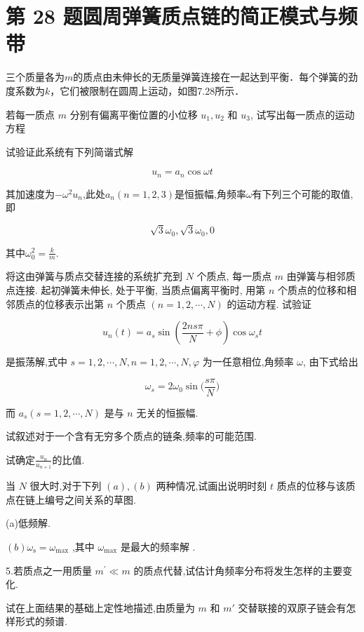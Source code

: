 \documentclass[UTF8,fontset=fandol,a4paper,11pt]{ctexart}
\newcommand{\tagline}[1]{\noindent{\small\color{muted}#1}\par}
\begin{document}
\section*{第 28 题\quad 圆周弹簧质点链的简正模式与频带}

\tagline{M-07-28}

三个质量各为\(m\)的质点由未伸长的无质量弹簧连接在一起达到平衡．每个弹簧的劲度系数为\(k\)，它们被限制在圆周上运动，如图7.28所示．

若每一质点 \(m\) 分别有偏离平衡位置的小位移 \(u_{1}, u_{2}\) 和
\(u_{3}\), 试写出每一质点的运动方程

试验证此系统有下列简谐式解

\[
u_{ n } = a_{ n } \cos \omega t
\]

其加速度为\(-\omega^{2}u_{n}\),此处\(a_{n}(n=1,2,3)\)是恒振幅,角频率\(\omega\)有下列三个可能的取值,即

\[
\sqrt{ 3 } \omega_{ 0 } , \sqrt{ 3 } \omega_{ 0 } , 0
\]

其中\(\omega_{0}^{2}=\frac{k}{m}\).

将这由弹簧与质点交替连接的系统扩充到 \(N\) 个质点, 每一质点 \(m\)
由弹簧与相邻质点连接. 起初弹簧未伸长, 处于平衡, 当质点偏离平衡时, 用第
\(n\) 个质点的位移和相邻质点的位移表示出第 \(n\) 个质点
\((n=1,2, \cdots, N)\) 的运动方程. 试验证

\[
u_{ n } ( t ) = a_{ s } \sin \left( \frac{ 2 n s \pi } { N } + \phi \right) \cos \omega_{ s } t
\]

是振荡解,式中 \(s=1,2,\cdots,N,n=1,2,\cdots,N,\varphi\)
为一任意相位,角频率 \(\omega\), 由下式给出

\[
\omega_{ s } = 2 \omega_{ 0 } \sin \bigg ( \frac{ s \pi } { N } \bigg )
\]

而 \(a_{s}(s=1,2,\cdots,N)\) 是与 \(n\) 无关的恒振幅.

试叙述对于一个含有无穷多个质点的链条,频率的可能范围.

试确定\(\frac{u_{n}}{u_{n+1}}\)的比值.

当 \(N\) 很大时,对于下列 \((a),(b)\) 两种情况,试画出说明时刻 \(t\)
质点的位移与该质点在链上编号之间关系的草图.

(a)低频解.

\((b)\omega_{\mathrm{s}}=\omega_{\mathrm{max}}\) ,其中
\(\omega_{\mathrm{max}}\) 是最大的频率解 .

5.若质点之一用质量 \(m^{\prime} \ll m\)
的质点代替,试估计角频率分布将发生怎样的主要变化.

试在上面结果的基础上定性地描述,由质量为 \(m\) 和 \(m'\)
交替联接的双原子链会有怎样形式的频谱.
\end{document}
